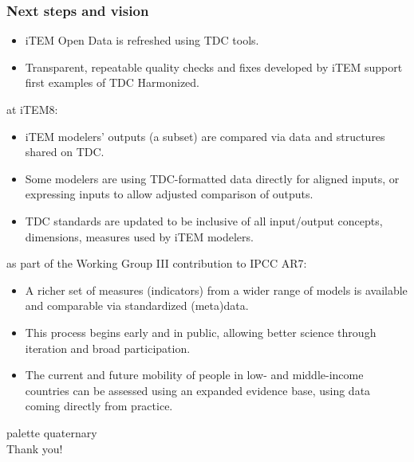 \documentclass[12pt,aspectratio=169]{beamer}
\begin{document}
\begin{frame}[allowframebreaks]
\frametitle{Next steps and vision}

\begin{itemize}
  \item iTEM Open Data is refreshed using TDC tools.
  \item Transparent, repeatable quality checks and fixes developed by iTEM support first examples of TDC Harmonized.
\end{itemize}

\bigskip
{} at iTEM8:
\begin{itemize}
  \item iTEM modelers' outputs (a subset) are compared via data and structures shared on TDC.
  \item Some modelers are using TDC-formatted data directly for aligned inputs, or expressing inputs to allow adjusted comparison of outputs.
  \item TDC standards are updated to be inclusive of all input/output concepts, dimensions, measures used by iTEM modelers.
\end{itemize}

\framebreak
{} as part of the Working Group III contribution to IPCC AR7:
\begin{itemize}
  \item A richer set of measures (indicators) from a wider range of models is available and comparable via standardized (meta)data.
  \item This process begins early and in public, allowing better science through iteration and broad participation.
  \item The current and future mobility of people in low- and middle-income countries can be assessed using an expanded evidence base, using data coming directly from practice.
\end{itemize}

\end{frame}

\begin{frame}[plain,c]

\begin{beamercolorbox}[rounded=true]{palette quaternary}
  \, \\
  \color{white} \Huge Thank you!
\end{beamercolorbox}

\end{frame}
\end{document}
